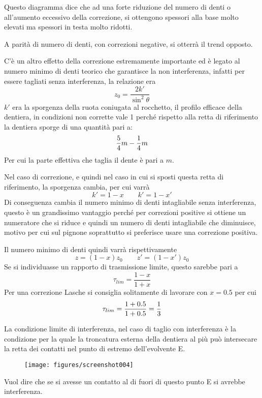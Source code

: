 \documentclass[a4paper, 15pt]{article}
\begin{document}
\begin{adjustwidth}{2in}{}
				 Questo diagramma dice che ad una forte riduzione del numero di denti o all'aumento eccessivo della correzione, si ottengono spessori alla base molto elevati ma spessori in testa molto ridotti. 
				 
				 A parità di numero di denti, con correzioni negative, si otterrà il trend opposto. \newline 
				 				 
				 C'è un altro effetto della correzione estremamente importante ed è legato al numero  minimo di denti teorico che garantisce la non interferenza, infatti per essere  tagliati senza interferenza, la relazione era 
				 \[z_0 = \dfrac{2k'}{\sin^2\theta}\]
				 $k'$ era la sporgenza della ruota coniugata al rocchetto, il profilo efficace della dentiera, in condizioni non corrette vale 1 perché rispetto alla retta di riferimento la dentiera sporge di una quantità pari a: 
				 \[{5\over4}m - {1\over4}m\]
				 Per cui la parte effettiva che taglia il dente è pari a $m$. 
				 
				 Nel caso di correzione, e quindi nel caso in cui si sposti questa retta di riferimento, la sporgenza cambia, per cui varrà 
				 \[k' = 1- x \qquad k'= 1-x'\]
				 Di conseguenza cambia il numero minimo di denti intagliabile senza interferenza, questo è un grandissimo vantaggio perché per correzioni positive si ottiene un numeratore che si riduce e quindi un numero di denti intagliabile che diminuisce, motivo per cui sul pignone soprattutto si preferisce usare una correzione positiva. \newline 
				 
				 Il numero minimo di denti quindi varrà rispettivamente 
				 \[z = (1-x)z_0 \qquad z'=(1-x')z_0\]
				 Se si individuasse un rapporto di trasmissione limite, questo sarebbe pari a 
				 \[\tau_{lim} = \dfrac{1-x}{1+x} \]
				 Per una correzione Lasche si consiglia solitamente di lavorare con $x = 0.5$ per cui 
				 \[\tau_{lim} = \dfrac{1 + 0.5}{1+0.5} = {1\over3} \]
				 
				 La condizione limite di interferenza, nel caso di taglio con interferenza  è la condizione per la quale la troncatura esterna della dentiera al più può intersecare la retta dei contatti nel punto di estremo dell'evolvente E.
				 \begin{figure}[H]
				 	\centering
				 	\texttt{[image: figures/screenshot004]}
				 	\label{fig:screenshot004.1}
				 \end{figure}
				 Vuol dire che se si avesse un contatto al di fuori di questo punto E si avrebbe interferenza.
				 

\end{adjustwidth}
\end{document}
